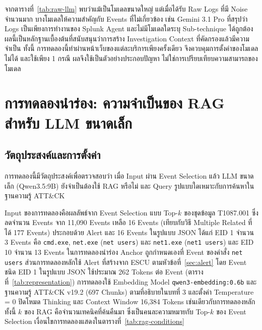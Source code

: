 จากตารางที่~\ref{tab:raw-llm} พบว่าแม้เป็นโมเดลขนาดใหญ่ แต่เมื่อได้รับ Raw Logs ที่มี Noise จำนวนมาก
บางโมเดลให้ความสำคัญกับ Events ที่ไม่เกี่ยวข้อง เช่น Gemini 3.1 Pro
ที่สรุปว่า Logs เป็นเพียงการทำงานของ Splunk Agent
และไม่มีโมเดลใดระบุ Sub-technique ได้ถูกต้อง
ผลนี้เป็นหลักฐานเบื้องต้นที่สนับสนุนว่าการสร้าง Investigation Context ที่คัดกรองแล้วมีความจำเป็น
ทั้งนี้ การทดลองนี้ทำผ่านหน้าเว็บของแต่ละบริการเพียงครั้งเดียว จึงควบคุมการตั้งค่าของโมเดลไม่ได้
และใช้เพียง 1 กรณี ผลจึงใช้เป็นตัวอย่างประกอบปัญหา ไม่ใช่การเปรียบเทียบความสามารถของโมเดล

\section{การทดลองนำร่อง: ความจำเป็นของ RAG สำหรับ LLM ขนาดเล็ก}

\subsection{วัตถุประสงค์และการตั้งค่า}
การทดลองนี้มีวัตถุประสงค์เพื่อตรวจสอบว่า เมื่อ Input ผ่าน Event Selection แล้ว
LLM ขนาดเล็ก (Qwen3.5:9B) ยังจำเป็นต้องใช้ RAG หรือไม่
และ Query รูปแบบใดเหมาะกับการค้นหาในฐานความรู้ ATT\&CK

Input ของการทดลองคือผลลัพธ์จาก Event Selection แบบ Top-$k$ ของชุดข้อมูล T1087.001
ซึ่งลดจำนวน Events จาก 11,090 Events เหลือ 16 Events
(เทียบกับวิธี Multiple Related ที่ได้ 177 Events)
ประกอบด้วย Alert และ 16 Events ในรูปแบบ JSON ได้แก่ EID 1 จำนวน 3 Events คือ \texttt{cmd.exe},
\texttt{net.exe} (\texttt{net users}) และ \texttt{net1.exe} (\texttt{net1 users})
และ EID 10 จำนวน 13 Events
ในการทดลองนำร่อง Anchor ถูกกำหนดเองที่ Event ของคำสั่ง \texttt{net users}
ส่วนการทดลองหลักใช้ Alert ที่สร้างจาก ESCU ตามหัวข้อที่~\ref{sec:alert}
โดย Event ชนิด EID 1 ในรูปแบบ JSON ใช้ประมาณ 262 Tokens ต่อ Event (ตารางที่~\ref{tab:representation})
การทดลองใช้ Embedding Model \texttt{qwen3-embedding:0.6b} และฐานความรู้ ATT\&CK v19.2 (697 Chunks)
ตามที่อธิบายในบทที่ 3
และตั้งค่า Temperature = 0 ปิดโหมด Thinking และ Context Window 16,384 Tokens เช่นเดียวกับการทดลองหลัก
ทั้งนี้ $k$ ของ RAG คือจำนวนเทคนิคที่ค้นคืนมา ซึ่งเป็นคนละความหมายกับ Top-$k$ ของ Event Selection
เงื่อนไขการทดลองแสดงในตารางที่~\ref{tab:rag-conditions}

